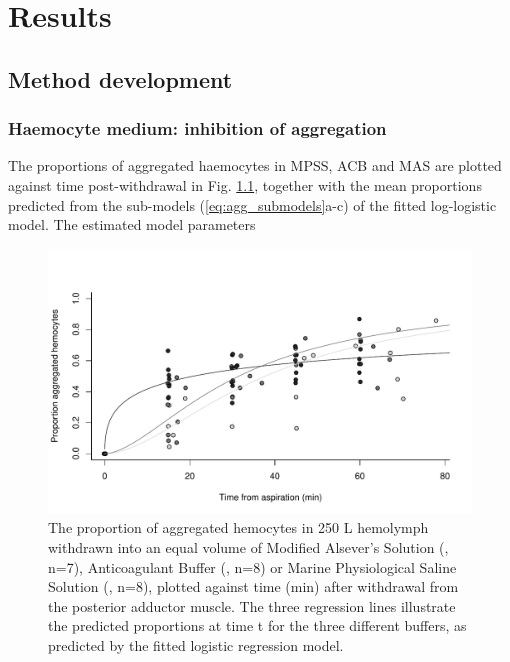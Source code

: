 \chapter{Results}
\label{chap:results}

\section{Method development}
\label{section:Results_Method_Development}
\subsection{Haemocyte medium: inhibition of aggregation}
The proportions of aggregated haemocytes in MPSS, ACB and MAS are plotted against time post-withdrawal in Fig. \ref{fig:aggregation}, together with the mean proportions predicted from the sub-models (\ref{eq:agg_submodels}a-c) of the fitted log-logistic model. The estimated model parameters 

\begin{figure}[!ht]
    \centering
    \includegraphics[width=1.0\textwidth]{figures/Method development/agg_plot_scaled.pdf}
    \caption{The proportion of aggregated hemocytes in 250 \micro L hemolymph withdrawn into an equal volume of Modified Alsever's Solution (\protect\lysegraacircle, n=7), Anticoagulant Buffer (\protect\graycircle, n=8) or Marine Physiological Saline Solution (\protect\darkgraycircle, n=8), plotted against time (min) after withdrawal from the posterior adductor muscle. The three regression lines illustrate the predicted proportions at time t for the three different buffers, as predicted by the fitted logistic regression model.}
    \label{fig:aggregation}
\end{figure}
 
